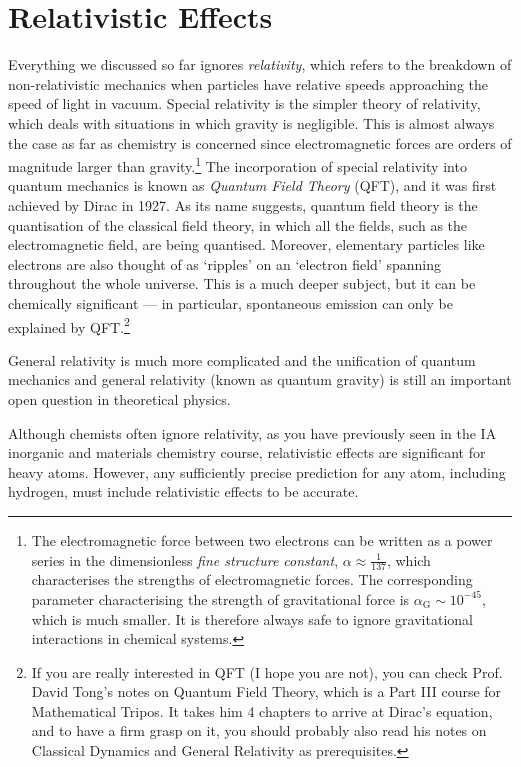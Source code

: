 \documentclass{article}
\theoremstyle{plain}\theoremheaderfont{\normalfont\itshape}\theorembodyfont{\rmfamily}\theoremseparator{.}\newtheorem*{rem}{Remark}\newtheorem*{ex}{Example}\newtheorem*{proof}{Proof}\newtheorem*{altp}{Alternative proof}
\theoremstyle{plain}\theoremheaderfont{\normalfont\bfseries}\theorembodyfont{\rmfamily}\theoremseparator{.}\newtheorem{thm}{Theorem}[section]\newtheorem{lem}[thm]{Lemma}\newtheorem{prop}[thm]{Proposition}\newtheorem*{cor}{Corollary}\newtheorem{defn}[thm]{Definition}\newtheorem{clm}[thm]{Claim}\newtheorem{clminproof}{Claim}
\theoremstyle{break}\theoremheaderfont{\normalfont\itshape}\theorembodyfont{\rmfamily}\theoremseparator{.\medskip}\newtheorem*{proofskip}{Proof}\newtheorem*{exs}{Examples}\newtheorem*{rems}{Remarks}
\theoremstyle{break}\theoremheaderfont{\normalfont\bfseries}\theorembodyfont{\rmfamily}\theoremseparator{.\medskip}\newtheorem{lemskip}[thm]{Lemma}\newtheorem{defnskip}[thm]{Definition}\newtheorem{propskip}[thm]{Proposition}\newtheorem{thmskip}[thm]{Theorem}
\numberwithin{equation}{section}
\begin{document}
    \section{Relativistic Effects}
    Everything we discussed so far ignores \textit{relativity}, which refers to the breakdown of non-relativistic mechanics when particles have relative speeds approaching the speed of light in vacuum. Special relativity is the simpler theory of relativity, which deals with situations in which gravity is negligible. This is almost always the case as far as chemistry is concerned since electromagnetic forces are orders of magnitude larger than gravity.\footnote{The electromagnetic force between two electrons can be written as a power series in the dimensionless \textit{fine structure constant}, \(\alpha\approx\frac{1}{137}\), which characterises the strengths of electromagnetic forces. The corresponding parameter characterising the strength of gravitational force is \(\alpha_{\text{G}}\sim 10^{-45}\), which is much smaller. It is therefore always safe to ignore gravitational interactions in chemical systems.} The incorporation of special relativity into quantum mechanics is known as \textit{Quantum Field Theory} (QFT), and it was first achieved by Dirac in 1927. As its name suggests, quantum field theory is the quantisation of the classical field theory, in which all the fields, such as the electromagnetic field, are being quantised. Moreover, elementary particles like electrons are also thought of as `ripples' on an `electron field' spanning throughout the whole universe. This is a much deeper subject, but it can be chemically significant --- in particular, spontaneous emission can only be explained by QFT.\footnote{If you are really interested in QFT (I hope you are not), you can check Prof. David Tong's notes on Quantum Field Theory, which is a Part III course for Mathematical Tripos. It takes him 4 chapters to arrive at Dirac's equation, and to have a firm grasp on it, you should probably also read his notes on Classical Dynamics and General Relativity as prerequisites.}
    
    General relativity is much more complicated and the unification of quantum mechanics and general relativity (known as quantum gravity) is still an important open question in theoretical physics.

    Although chemists often ignore relativity, as you have previously seen in the IA inorganic and materials chemistry course, relativistic effects are significant for heavy atoms. However, any sufficiently precise prediction for any atom, including hydrogen, must include relativistic effects to be accurate.
\end{document}
